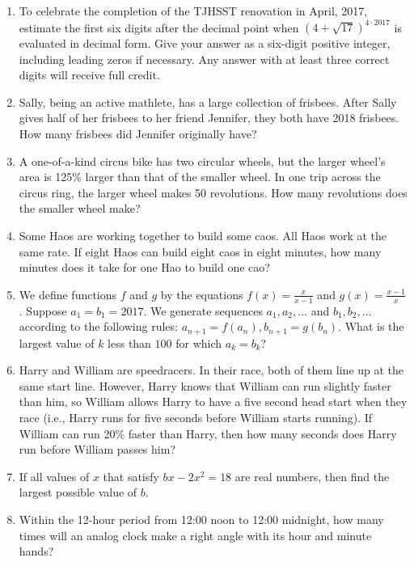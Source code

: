 \documentclass[11pt]{article}
\begin{document}
\begin{enumerate}[1.]
			\item To celebrate the completion of the TJHSST renovation in April, 2017, estimate the first six digits after the decimal point when $\left(4 + \sqrt{17}\right)^{4\cdot2017}$ is evaluated in decimal form. Give your answer as a six-digit positive integer, including leading zeros if necessary. Any answer with at least three correct digits will receive full credit.
			
			\item Sally, being an active mathlete, has a large collection of frisbees. After Sally gives half of her frisbees to her friend Jennifer, they both have 2018 frisbees. How many frisbees did Jennifer originally have?
			
			\item A one-of-a-kind circus bike has two circular wheels, but the larger wheel's area is 125\% larger than that of the smaller wheel. In one trip across the circus ring, the larger wheel makes 50 revolutions. How many revolutions does the smaller wheel make?
      
			\item Some Haos are working together to build some caos. All Haos work at the same rate. If eight Haos can build eight caos in eight minutes, how many minutes does it take for one Hao to build one cao?
			
			\item We define functions $f$ and $g$ by the equations $f(x) = \frac{x}{x - 1}$ and $g(x) = \frac{x - 1}{x}$. Suppose $a_1 = b_1 = 2017$. We generate sequences $a_1, a_2, \ldots$ and $b_1, b_2, \ldots$ according to the following rules: $a_{n+1} = f\left(a_n\right), b_{n+1} = g\left(b_n\right)$. What is the largest value of $k$ less than $100$ for which $a_k = b_k$? 
			
			\item Harry and William are speedracers. In their race, both of them line up at the same start line. However, Harry knows that William can run slightly faster than him, so William allows Harry to have a five second head start when they race (i.e., Harry runs for five seconds before William starts running). If William can run 20\% faster than Harry, then how many seconds does Harry run before William passes him?
			
			\item If all values of $x$ that satisfy $bx - 2x^2 = 18$ are real numbers, then find the largest possible value of $b$.
			
			\item Within the 12-hour period from 12:00 noon to 12:00 midnight, how many times will an analog clock make a right angle with its hour and minute hands?
			

\end{enumerate}
\end{document}
